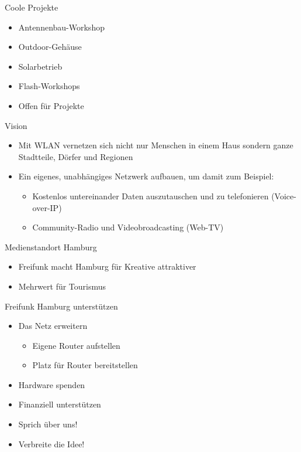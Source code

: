 \documentclass[c]{beamer}
\begin{document}
\begin{frame}{Coole Projekte}
	\begin{itemize}
		\item Antennenbau-Workshop
		\item Outdoor-Gehäuse
		\item Solarbetrieb
		\item Flash-Workshops
		\item Offen für Projekte
	\end{itemize}
\end{frame}

\begin{frame}{Vision}
	\begin{itemize}
		\item Mit WLAN vernetzen sich nicht nur Menschen in einem Haus sondern ganze Stadtteile, Dörfer und Regionen %
		\item Ein eigenes, unabhängiges Netzwerk aufbauen, um damit zum Beispiel:
		\begin{itemize}
			\item Kostenlos untereinander Daten auszutauschen und zu telefonieren (Voice-over-IP)
			\item Community-Radio und Videobroadcasting (Web-TV)
		\end{itemize}
	\end{itemize}
\end{frame}

\begin{frame}{Medienstandort Hamburg}
	\begin{itemize}
		\item Freifunk macht Hamburg für Kreative attraktiver
		\item Mehrwert für Tourismus
	\end{itemize}
\end{frame}

\begin{frame}{Freifunk Hamburg unterstützen}
	\begin{itemize}
		\item Das Netz erweitern
		\begin{itemize}
			\item Eigene Router aufstellen
			\item Platz für Router bereitstellen
		\end{itemize}
		\item Hardware spenden
		\item Finanziell unterstützen
		\item Sprich über uns!
		\item Verbreite die Idee!
	\end{itemize}
\end{frame}
\end{document}
